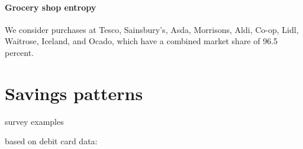 \paragraph{Grocery shop entropy}%
\label{par:grocery_shop_entropy}

We consider purchases at Tesco, Sainsbury's, Asda, Morrisons, Aldi, Co-op,
Lidl, Waitrose, Iceland, and Ocado, which have a combined market share of 96.5
percent.

\section{Savings patterns}%
\label{sec:savings_patterns}

survey examples

based on debit card data:


